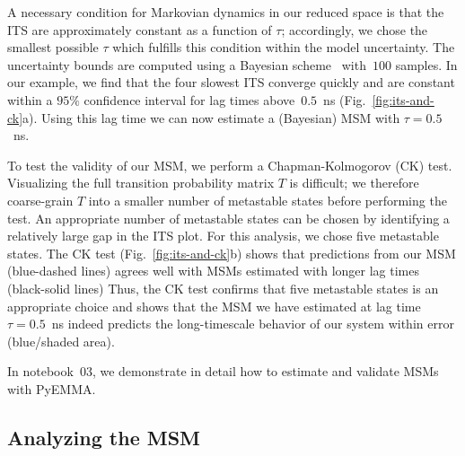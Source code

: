 \documentclass[9pt,tutorial]{livecoms}
\begin{document}
A necessary condition for Markovian dynamics in our reduced space is that the ITS are approximately constant as a function of $\tau$;
accordingly, we chose the smallest possible $\tau$ which fulfills this condition within the model uncertainty.
The uncertainty bounds are computed using a Bayesian scheme~\cite{ben-rev-msm,noe-tmat-sampling} with~$100$ samples.
In our example, we find that the four slowest ITS converge quickly and are constant within a $95\%$ confidence interval for lag times above~$0.5$~ns (Fig.~\ref{fig:its-and-ck}a).
Using this lag time we can now estimate a (Bayesian) MSM with $\tau=0.5$~ns. 

To test the validity of our MSM, we perform a Chapman-Kolmogorov (CK) test.
Visualizing the full transition probability matrix $T$ is difficult;
we therefore coarse-grain $T$ into a smaller number of metastable states before performing the test.
An appropriate number of metastable states can be chosen by identifying a relatively large gap in the ITS plot.
For this analysis, we chose five metastable states.
The CK test (Fig.~\ref{fig:its-and-ck}b) shows that predictions from our MSM (blue-dashed lines)
agrees well with MSMs estimated with longer lag times (black-solid lines)
Thus, the CK test confirms that five metastable states is an appropriate choice
and shows that the MSM we have estimated at lag time $\tau=0.5$~ns indeed predicts the
long-timescale behavior of our system within error (blue/shaded area).

In notebook~03, we demonstrate in detail how to estimate and validate MSMs with PyEMMA.

\subsection{Analyzing the MSM}
\end{document}
